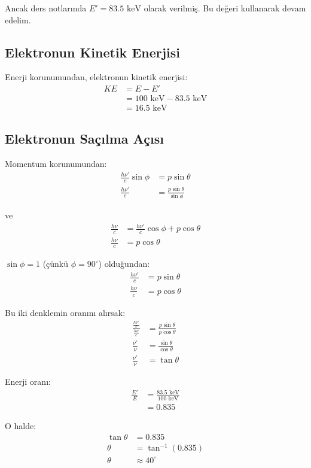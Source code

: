 \documentclass[11pt,letterpaper]{fenbil}
\begin{document}
Ancak ders notlarında $E' = 83.5 \text{ keV}$ olarak verilmiş. Bu değeri kullanarak devam edelim.

\subsection{Elektronun Kinetik Enerjisi}

Enerji korunumundan, elektronun kinetik enerjisi:
\begin{align}
KE &= E - E' \\
&= 100 \text{ keV} - 83.5 \text{ keV} \\
&= 16.5 \text{ keV}
\end{align}

\subsection{Elektronun Saçılma Açısı}

Momentum korunumundan:
\begin{align}
\frac{h\nu'}{c}\sin\phi &= p\sin\theta \\
\frac{h\nu'}{c} &= \frac{p\sin\theta}{\sin\phi}
\end{align}

ve
\begin{align}
\frac{h\nu}{c} &= \frac{h\nu'}{c}\cos\phi + p\cos\theta \\
\frac{h\nu}{c} &= p\cos\theta
\end{align}

$\sin\phi = 1$ (çünkü $\phi = 90^\circ$) olduğundan:
\begin{align}
\frac{h\nu'}{c} &= p\sin\theta \\
\frac{h\nu}{c} &= p\cos\theta
\end{align}

Bu iki denklemin oranını alırsak:
\begin{align}
\frac{\frac{h\nu'}{c}}{\frac{h\nu}{c}} &= \frac{p\sin\theta}{p\cos\theta} \\
\frac{\nu'}{\nu} &= \frac{\sin\theta}{\cos\theta} \\
\frac{\nu'}{\nu} &= \tan\theta
\end{align}

Enerji oranı:
\begin{align}
\frac{E'}{E} &= \frac{83.5 \text{ keV}}{100 \text{ keV}} \\
&= 0.835
\end{align}

O halde:
\begin{align}
\tan\theta &= 0.835 \\
\theta &= \tan^{-1}(0.835) \\
\theta &\approx 40^\circ
\end{align}
\end{document}
